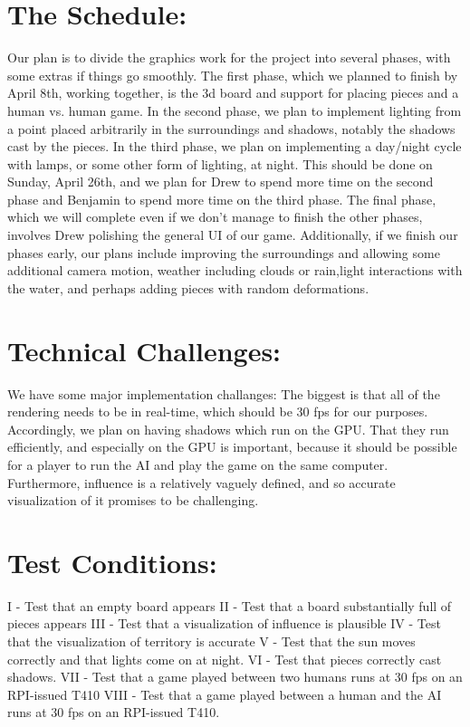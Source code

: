 \documentclass[12pt,a4paper]{report}
\begin{document}
\section*{The Schedule:}
Our plan is to divide the graphics work for the project into several phases, with some extras if things go smoothly.
The first phase, which we planned to finish by April 8th, working together, is the 3d board and support for placing pieces and a human vs. human game.
In the second phase, we plan to implement lighting from a point placed arbitrarily in the surroundings and shadows, notably the shadows cast by the pieces.
In the third phase, we plan on implementing a day/night cycle with lamps, or some other form of lighting, at night. This should be done on Sunday, April 26th, and we plan for Drew to spend more time on the second phase and Benjamin to spend more time on the third phase.
The final phase, which we will complete even if we don't manage to finish the other phases, involves Drew polishing the general UI of our game.
Additionally, if we finish our phases early, our plans include improving the surroundings and allowing some additional camera motion, weather including clouds or rain,light interactions with the water, and perhaps adding pieces with random deformations.

\section*{Technical Challenges:}
We have some major implementation challanges:
The biggest is that all of the rendering needs to be in real-time, which should be 30 fps for our purposes. Accordingly, we plan on having shadows which run on the GPU.
That they run efficiently, and especially on the GPU is important, because it should be possible for a player to run the AI and play the game on the same computer.
Furthermore, influence is a relatively vaguely defined, and so accurate visualization of it promises to be challenging.

\section*{Test Conditions:}
I - Test that an empty board appears\newline
II - Test that a board substantially full of pieces appears\newline
III - Test that a visualization of influence is plausible\newline
IV - Test that the visualization of territory is accurate\newline
V - Test that the sun moves correctly and that lights come on at night.\newline
VI - Test that pieces correctly cast shadows.\newline
VII - Test that a game played between two humans runs at 30 fps on an RPI-issued T410\newline
VIII - Test that a game played between a human and the AI runs at 30 fps on an RPI-issued T410.\newline



\end{document}
